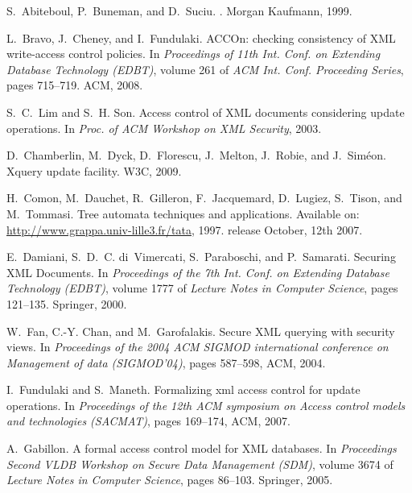 \documentclass[a4paper]{article}
\theoremstyle{plain}
\begin{document}
\begin{thebibliography}{10}

S.~Abiteboul, P.~Buneman, and D.~Suciu.
.
\newblock Morgan Kaufmann, 1999.

L.~Bravo, J.~Cheney, and I.~Fundulaki.
\newblock ACCOn: checking consistency of XML write-access control policies.
\newblock In {\em Proceedings of 11th Int. Conf. on Extending
  Database Technology (EDBT)}, volume
  261 of {\em ACM Int. Conf. Proceeding Series}, pages 715--719.
  ACM, 2008.

S.~C.~Lim and S.~H. Son.
\newblock Access control of XML documents considering update operations.
\newblock In {\em Proc. of ACM Workshop on XML Security}, 2003.

D.~Chamberlin, M.~Dyck, D.~Florescu, J.~Melton, J.~Robie, and J.~Sim{\'e}on.
\newblock Xquery update facility.
\newblock W3C, 2009.

H.~Comon, M.~Dauchet, R.~Gilleron, F.~Jacquemard, D.~Lugiez, S.~Tison, and M.~Tommasi.
\newblock Tree automata techniques and applications.
\newblock Available on: \url{http://www.grappa.univ-lille3.fr/tata}, 1997.
\newblock release October, 12th 2007.

E.~Damiani, S.~D.~C. di~Vimercati, S.~Paraboschi, and P.~Samarati.
\newblock Securing XML Documents.
\newblock In {\em Proceedings of the 7th Int. Conf. on Extending
  Database Technology (EDBT)}, volume 1777 of {\em Lecture Notes in
  Computer Science}, pages 121--135. Springer, 2000.

W.~Fan, C.-Y. Chan, and M.~Garofalakis.
\newblock Secure XML querying with security views.
\newblock In {\em Proceedings of the 2004 ACM SIGMOD international conference
  on Management of data (SIGMOD'04)}, pages 587--598, ACM, 2004.

I.~Fundulaki and S.~Maneth.
\newblock Formalizing xml access control for update operations.
\newblock In {\em Proceedings of the 12th ACM symposium on Access
  control models and technologies (SACMAT)}, pages 169--174, ACM, 2007.

A.~Gabillon.
\newblock A formal access control model for XML databases.
\newblock In {\em Proceedings Second VLDB Workshop on Secure Data Management (SDM)}, 
  volume 3674 of {\em Lecture Notes in Computer Science}, pages 86--103. Springer, 2005.


\end{thebibliography}
\end{document}
